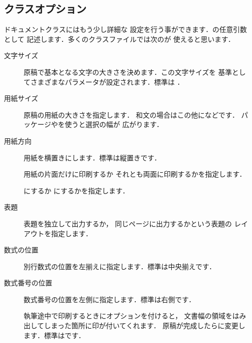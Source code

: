 \subsection{クラスオプション}
ドキュメントクラスにはもう少し詳細な
設定を行う事ができます．の任意引数として
記述します．多くのクラスファイルでは次のが
使えると思います．
\begin{description}
\item[{文字サイズ}{\Optionlist{10pt,11pt,12pt}}] 
%
%
原稿で基本となる文字の大きさを決めます．この文字サイズを
基準としてさまざまなパラメータが設定されます．標準は
\option{10pt}．

\item[{用紙サイズ}{}]
原稿の用紙の大きさを指定します．
%
%
%
和文の場合はこの他になどです．
パッケージやを使うと選択の幅が
広がります．

\item[{用紙方向}{}]
用紙を横置きにします．標準は縦置きです．

\item[]
用紙の片面だけに印刷するか
それとも両面に印刷するかを指定します．
\item[]
%
にするか
にするかを指定します．

\item[{表題}{}]
表題を独立して出力するか，
同じページに出力するかという表題の
レイアウトを指定します．

\item[{数式の位置}{}]
%	   
別行数式の位置を左揃えに指定します．標準は中央揃えです．
	
\item[{数式番号の位置}{}]
%
数式番号の位置を左側に指定します．標準は右側です．
	
\item[]
%
%
執筆途中で印刷するときにオプションを付けると，
文書幅の領域をはみ出してしまった箇所に印が付いてくれます．
原稿が完成したらに変更します．標準はです．


\end{description}
